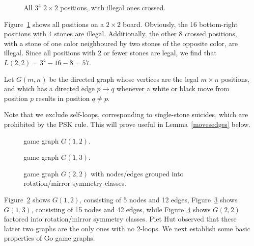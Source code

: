 \documentclass{article}
\begin{document}
\begin{figure}
\begin{center}
\epsfxsize=9cm 
\end{center}
\caption{All $3^4$ $2 \times 2$ positions, with illegal ones crossed.}
\label{ALL2}
\end{figure}

Figure~\ref{ALL2} shows all positions on a $2 \times 2$ board.
Obviously, the 16 bottom-right positions with 4 stones are illegal.
Additionally, the other $8$ crossed positions,
with a stone of one color neighboured by two stones of
the opposite color, are illegal. Since all positions with 2 or fewer stones
are legal, we find that $L(2,2) = 3^4-16-8=57$.

\begin{defin}
Let $G(m,n)$ be the directed graph whose vertices are the legal $m\times n$
positions, and which has a directed edge $p \rightarrow q$ whenever
a white or black move from position $p$ results in position $q \neq p$.
\end{defin}

Note that we exclude self-loops, corresponding to single-stone suicides,
which are prohibited by the PSK rule.
This will prove useful in Lemma~\ref{movesedges} below.

\begin{figure}
\begin{center}
\epsfxsize=4cm 
\end{center}
\caption{game graph $G(1,2)$.}
\label{G21}
\end{figure}

\begin{figure}
\epsfxsize=12cm 
\caption{game graph $G(1,3)$.}
\label{G31}
\end{figure}

\begin{figure}
\epsfxsize=12cm 
\caption{game graph $G(2,2)$ with nodes/edges grouped
into rotation/mirror symmetry classes.}
\label{G2}
\end{figure}

Figure~\ref{G21} shows $G(1,2)$, consisting of 5 nodes and 12 edges,
Figure~\ref{G31} shows $G(1,3)$, consisting of 15 nodes and 42 edges,
while Figure~\ref{G2} shows $G(2,2)$ factored into rotation/mirror
symmetry classes. Piet Hut observed that
these latter two graphs are the only ones with no 2-loops.
We next establish some basic properties of Go game graphs.
\end{document}
